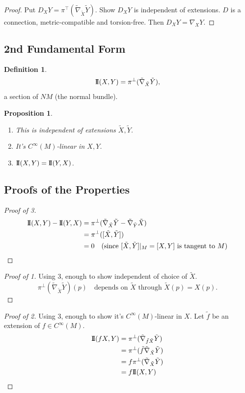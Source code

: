 \documentclass[11pt, a4paper]{article}
\theoremstyle{plain}
\newtheorem{proposition}[theorem]{Proposition}
\theoremstyle{definition}
\newtheorem{definition}[theorem]{Definition}
\theoremstyle{remark}
\begin{document}
{\begin{proof}
Put $D_X Y = \pi^\top(\tilde{\nabla}_{\tilde{X}} \tilde{Y})$. Show $D_X Y$ is independent of extensions. $D$ is a connection, metric-compatible and torsion-free. Then $D_X Y = \nabla_X Y$.
\end{proof}

\subsection*{2nd Fundamental Form}

\begin{definition}
\[
\mathrm{I\!I}(X, Y) = \pi^\perp(\tilde{\nabla}_{\tilde{X}} \tilde{Y}),
\]
a section of $NM$ (the normal bundle).
\end{definition}

\begin{proposition}
\begin{enumerate}
    \item This is independent of extensions $\tilde{X}, \tilde{Y}$.
    \item It's $C^\infty(M)$-linear in $X, Y$.
    \item $\mathrm{I\!I}(X, Y) = \mathrm{I\!I}(Y, X)$.
\end{enumerate}
\end{proposition}

\subsection*{Proofs of the Properties}

\begin{proof}[Proof of 3]
\begin{align*}
\mathrm{I\!I}(X, Y) - \mathrm{I\!I}(Y, X) &= \pi^\perp(\tilde{\nabla}_{\tilde{X}} \tilde{Y} - \tilde{\nabla}_{\tilde{Y}} \tilde{X}) \\
&= \pi^\perp([\tilde{X}, \tilde{Y}]) \\
&= 0 \quad (\text{since } [\tilde{X}, \tilde{Y}]|_M = [X, Y] \text{ is tangent to } M)
\end{align*}
\end{proof}

\begin{proof}[Proof of 1]
Using 3, enough to show independent of choice of $\tilde{X}$.
\[
\pi^\perp(\tilde{\nabla}_{\tilde{X}} \tilde{Y})(p) \quad \text{depends on } \tilde{X} \text{ through } \tilde{X}(p) = X(p).
\]
\end{proof}

\begin{proof}[Proof of 2]
Using 3, enough to show it's $C^\infty(M)$-linear in $X$. Let $\tilde{f}$ be an extension of $f \in C^\infty(M)$.
\begin{align*}
\mathrm{I\!I}(fX, Y) &= \pi^\perp(\tilde{\nabla}_{\tilde{f}\tilde{X}} \tilde{Y}) \\
&= \pi^\perp(\tilde{f} \tilde{\nabla}_{\tilde{X}} \tilde{Y}) \\
&= f \pi^\perp(\tilde{\nabla}_{\tilde{X}} \tilde{Y}) \\
&= f \mathrm{I\!I}(X, Y)
\end{align*}
\end{proof}

}
\end{document}
